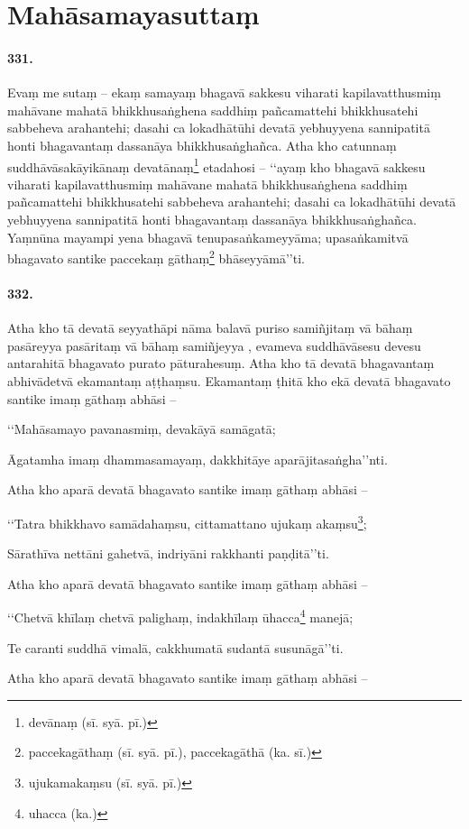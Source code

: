 \section{Mahāsamayasuttaṃ}

\paragraph{331.} Evaṃ me sutaṃ – ekaṃ samayaṃ bhagavā sakkesu viharati kapilavatthusmiṃ mahāvane mahatā bhikkhusaṅghena saddhiṃ pañcamattehi bhikkhusatehi sabbeheva arahantehi; dasahi ca lokadhātūhi devatā yebhuyyena sannipatitā honti bhagavantaṃ dassanāya bhikkhusaṅghañca. Atha kho catunnaṃ suddhāvāsakāyikānaṃ devatānaṃ\footnote{devānaṃ (sī. syā. pī.)} etadahosi – ‘‘ayaṃ kho bhagavā sakkesu viharati kapilavatthusmiṃ mahāvane mahatā bhikkhusaṅghena saddhiṃ pañcamattehi bhikkhusatehi sabbeheva arahantehi; dasahi ca lokadhātūhi devatā yebhuyyena sannipatitā honti bhagavantaṃ dassanāya bhikkhusaṅghañca. Yaṃnūna mayampi yena bhagavā tenupasaṅkameyyāma; upasaṅkamitvā bhagavato santike paccekaṃ gāthaṃ\footnote{paccekagāthaṃ (sī. syā. pī.), paccekagāthā (ka. sī.)} bhāseyyāmā’’ti.

\paragraph{332.} Atha kho tā devatā seyyathāpi nāma balavā puriso samiñjitaṃ vā bāhaṃ pasāreyya pasāritaṃ vā bāhaṃ samiñjeyya , evameva suddhāvāsesu devesu antarahitā bhagavato purato pāturahesuṃ. Atha kho tā devatā bhagavantaṃ abhivādetvā ekamantaṃ aṭṭhaṃsu. Ekamantaṃ ṭhitā kho ekā devatā bhagavato santike imaṃ gāthaṃ abhāsi –

‘‘Mahāsamayo pavanasmiṃ, devakāyā samāgatā;

Āgatamha imaṃ dhammasamayaṃ, dakkhitāye aparājitasaṅgha’’nti.

Atha kho aparā devatā bhagavato santike imaṃ gāthaṃ abhāsi –

‘‘Tatra bhikkhavo samādahaṃsu, cittamattano ujukaṃ akaṃsu\footnote{ujukamakaṃsu (sī. syā. pī.)};

Sārathīva nettāni gahetvā, indriyāni rakkhanti paṇḍitā’’ti.

Atha kho aparā devatā bhagavato santike imaṃ gāthaṃ abhāsi –

‘‘Chetvā khīlaṃ chetvā palighaṃ, indakhīlaṃ ūhacca\footnote{uhacca (ka.)} manejā;

Te caranti suddhā vimalā, cakkhumatā sudantā susunāgā’’ti.

Atha kho aparā devatā bhagavato santike imaṃ gāthaṃ abhāsi –

